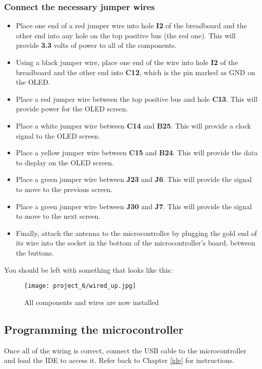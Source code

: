 \subsubsection{Connect the necessary jumper wires}
\begin{itemize}
    \item Place one end of a red jumper wire into hole \textbf{I2} of the breadboard and the other end into
    any hole on the top positive bus (the red one). This will provide \textbf{3.3} volts of power to all of the components.
    \item Using a black jumper wire, place one end of the wire into hole \textbf{I2} of the breadboard and the other
    end into \textbf{C12}, which is the pin marked as GND on the OLED.
    \item Place a red jumper wire between the top positive bus and hole \textbf{C13}. This will provide power for the OLED screen.
    \item Place a white jumper wire between \textbf{C14} and \textbf{B25}. This will provide a clock signal to the OLED screen.
    \item Place a yellow jumper wire between \textbf{C15} and \textbf{B24}. This will provide the data to display on the OLED screen.
    \item Place a green jumper wire between \textbf{J23} and \textbf{J6}. This will provide the signal to move to the previous screen.
    \item Place a green jumper wire between \textbf{J30} and \textbf{J7}. This will provide the signal to move to the next screen.
    \item Finally, attach the antenna to the microcontroller by plugging the gold end of its wire into the socket in the bottom of
    the microcontroller's board, between the buttons.
\end{itemize}

You should be left with something that looks like this:
\begin{figure}[H]
    \centering
    \texttt{[image: project\_6/wired\_up.jpg]}
    \caption{All components and wires are now installed}
\end{figure}

\subsection{Programming the microcontroller}
Once all of the wiring is correct, connect the USB cable to the microcontroller and load the IDE to
access it. Refer back to Chapter \ref{ide} for instructions.

